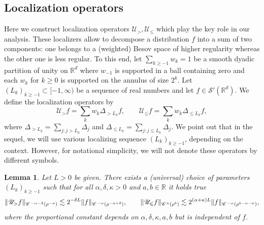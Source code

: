 \documentclass[a4paper,11pt]{article}
\renewcommand{\leq}{\leqslant}
\renewcommand{\geq}{\geqslant}
\newtheorem{lemma}[theorem]{Lemma}
\numberwithin{equation}{section}
\newcommand{\CC}{\mathscr{C} \hspace{.1em}}
\newcommand{\UU}{\mathscr{U}}
\newcommand{\R}{\mathbb{R}}
\newcommand{\8}{\infty}
\begin{document}
\subsection{Localization operators}
\label{ssec:local}



Here we construct localization operators $\UU_{>},
\UU_{\leqslant}$ which play the key role in our analysis. These localizers allow to decompose  a distribution $f$ into a sum of two components: one belongs to a (weighted) Besov space of higher regularity whereas the other one is less regular. To this end, let  $\sum_{k\geq-1} w_k = 1$ be a smooth dyadic  partition of unity on $\R^{d}$
where $w_{-1}$ is supported in a ball containing zero and each $w_k$ for $k\geq0$ is supported on the annulus of size $2^k$.
%
Let $(L_{k})_{k\geq -1}\subset [-1,\infty)$ be a sequence of real numbers and let $f\in\mathcal{S}'(\R^{d})$. We define the localization operators by
\[ \UU_{>} f = \sum_k w_k \Delta_{> L_k} f, \qquad
   \UU_{\leqslant} f = \sum_k w_k \Delta_{\leqslant L_k} f, \]
where $\Delta_{>L_{k}}=\sum_{j:j>L_{k}}\Delta_{j}$ and $\Delta_{\leq L_{k}}=\sum_{j:j\leq L_{k}}\Delta_{j}$. We point out that in the sequel, we will use various localizing sequence $(L_{k})_{k\geq -1}$, depending on the context. However, for notational simplicity, we
will not denote these operators by different symbols.


\begin{lemma}\label{lem:local}
Let $L>0$ be given. There exists a (universal) choice of parameters $(L_k)_{k\geq -1}$ such that for all $\alpha,\delta,\kappa>0$ and $a,b\in\R$ it holds true
      \[ \| \UU_{>} f \|_{\CC^{- \alpha - \delta} (\rho^{- a})} \lesssim 2^{- \delta L} \| f \|_{\CC^{- \alpha}
     (\rho^{-a+\delta})}, \qquad \| \UU_{\leqslant} f \|_{\CC^{\kappa}
     (\rho^{b})} \lesssim 2^{(\alpha + \kappa)
     L} \| f \|_{\CC^{- \alpha} (\rho^{b-\alpha-\kappa})}, \]
          where the proportional constant depends on $\alpha,\delta,\kappa,a,b$ but is independent of $f$.
\end{lemma}
\end{document}
